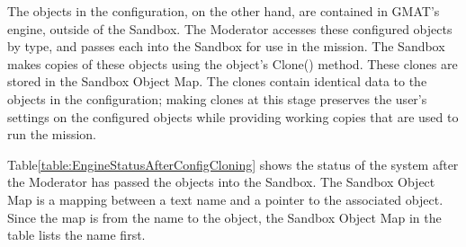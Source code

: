 The objects in the configuration, on the other hand, are contained in GMAT's engine, outside of the
Sandbox.  The Moderator accesses these configured objects by type, and passes each into the Sandbox
for use in the mission.  The Sandbox makes copies of these objects using the object's Clone()
method.  These clones are stored in the Sandbox Object Map.  The clones contain identical data to
the objects in the configuration; making clones at this stage preserves the user's settings on the
configured objects while providing working copies that are used to run the mission.

Table\ref{table:EngineStatusAfterConfigCloning} shows the status of the system after the Moderator
has passed the objects into the Sandbox.  The Sandbox Object Map is a mapping between a text name
and a pointer to the associated object.  Since the map is from the name to the object, the Sandbox
Object Map in the table lists the name first.

